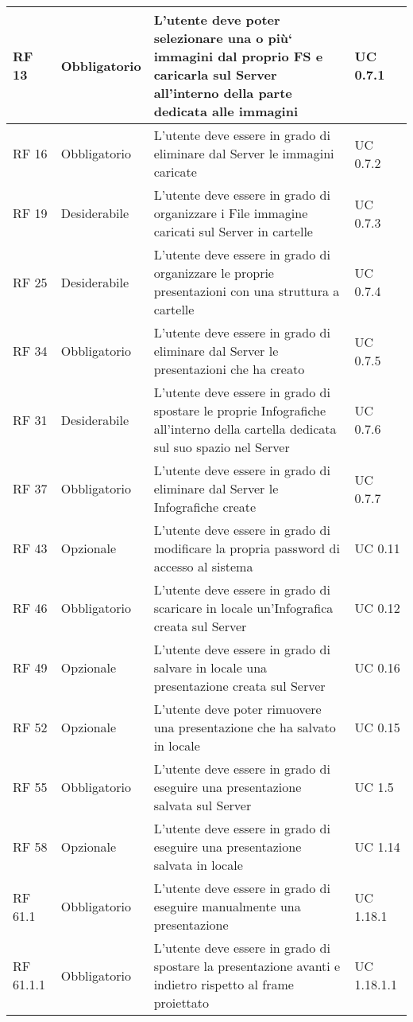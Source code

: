 {\begin{longtable} [c]{| p{2.5cm} | p{2.5cm} | p{6cm} |p{2.5cm}|}
		\hline
		RF 13 & Obbligatorio & L’utente deve poter selezionare una o più` immagini dal proprio FS e caricarla sul Server\ped{g} all’interno della parte dedicata alle immagini & UC 0.7.1\\
		\hline
		RF 16 & Obbligatorio & L’utente deve essere in grado di eliminare dal Server\ped{g} le immagini caricate & UC 0.7.2\\			
		\hline
		RF 19 & Desiderabile & L'utente deve essere in grado di organizzare i File\ped{g} immagine caricati sul Server\ped{g} in cartelle & UC 0.7.3\\
		\hline
		RF 25 & Desiderabile & L'utente deve essere in grado di organizzare le proprie presentazioni con una struttura a cartelle & UC 0.7.4\\
		\hline
		RF 34 & Obbligatorio & L’utente deve essere in grado di eliminare dal Server\ped{g} le presentazioni che ha creato  & UC 0.7.5\\
		\hline
		RF 31 & Desiderabile & L'utente deve essere in grado di spostare le proprie Infografiche\ped{g} all’interno della cartella dedicata sul suo spazio nel Server\ped{g} & UC 0.7.6\\
		\hline
		RF 37 & Obbligatorio & L’utente deve essere in grado di eliminare dal Server\ped{g} le Infografiche\ped{g} create & UC 0.7.7\\
		\hline
		RF 43 & Opzionale & L'utente deve essere in grado di modificare la propria password di accesso al sistema & UC 0.11\\						
		\hline
		RF 46 & Obbligatorio & L'utente deve essere in grado di scaricare in locale un’Infografica\ped{g} creata sul Server\ped{g} & UC 0.12\\
		\hline
		RF 49 & Opzionale & L'utente deve essere in grado di salvare in locale una presentazione creata sul Server\ped{g} & UC 0.16\\
		\hline
		RF 52 & Opzionale & L’utente deve poter rimuovere una presentazione che ha salvato in locale & UC 0.15\\
		\hline
		RF 55 & Obbligatorio & L'utente deve essere in grado di eseguire una presentazione salvata sul Server\ped{g} & UC 1.5\\
		\hline
		RF 58 & Opzionale & L'utente deve essere in grado di eseguire una presentazione salvata in locale & UC 1.14\\
		\hline
		RF 61.1 & Obbligatorio & L'utente deve essere in grado di eseguire manualmente una presentazione & UC 1.18.1\\
		\hline
		RF 61.1.1 & Obbligatorio & L'utente deve essere in grado di spostare la presentazione avanti e indietro rispetto al frame\ped{g} proiettato & UC 1.18.1.1\\

\end{longtable}}
